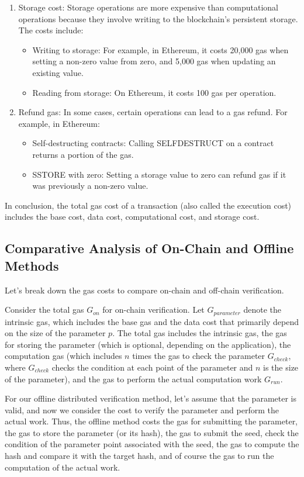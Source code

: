 \documentclass[runningheads]{llncs}
\begin{document}
\begin{enumerate}
\item Storage cost: Storage operations are more expensive than computational operations because they involve writing to the blockchain's persistent storage. The costs include:
\begin{itemize}
    \item Writing to storage: For example, in Ethereum, it costs 20,000 gas when setting a non-zero value from zero, and 5,000 gas when updating an existing value.
    \item Reading from storage: On Ethereum, it costs 100 gas per operation.
\end{itemize}

\item Refund gas: In some cases, certain operations can lead to a gas refund. For example, in Ethereum:
\begin{itemize}
    \item Self-destructing contracts: Calling SELFDESTRUCT on a contract returns a portion of the gas.
    \item SSTORE with zero: Setting a storage value to zero can refund gas if it was previously a non-zero value.
\end{itemize}

\end{enumerate}

In conclusion, the total gas cost of a transaction (also called the execution cost) includes the base cost, data cost, computational cost, and storage cost.
\subsection{Comparative Analysis of On-Chain and Offline Methods}
Let's break down the gas costs to compare on-chain and off-chain verification.

Consider the total gas $G_{on}$ for on-chain verification. Let $G_{parameter}$ denote the intrinsic gas, which includes the base gas and the data cost that primarily depend on the size of the parameter $p$. The total gas includes the intrinsic gas, the gas for storing the parameter (which is optional, depending on the application), the computation gas (which includes $n$ times the gas to check the parameter $G_{check}$, where $G_{check}$ checks the condition at each point of the parameter and $n$ is the size of the parameter), and the gas to perform the actual computation work $G_{run}$.

For our offline distributed verification method, let's assume that the parameter is valid, and now we consider the cost to verify the parameter and perform the actual work. %
Thus, the offline method costs the gas for submitting the parameter, the gas to store the parameter (or its hash), the gas to submit the seed, check the condition of the parameter point associated with the seed, the gas to compute the hash and compare it with the target hash, and of course the gas to run the computation of the actual work.
\end{document}
